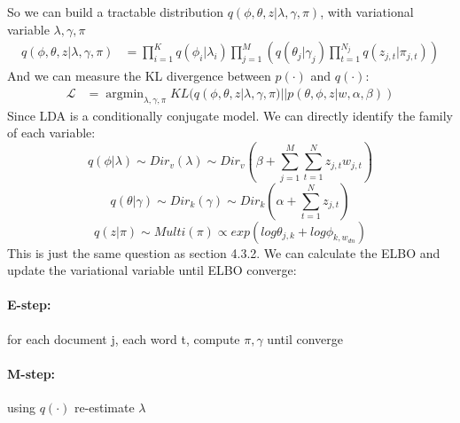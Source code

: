 \documentclass{article}
\begin{document}
So we can build a tractable distribution $q(\phi,\theta,z|\lambda ,\gamma, \pi)$, with variational variable $\lambda ,\gamma, \pi$
\begin{align*}
q(\phi,\theta,z|\lambda ,\gamma, \pi) &= \prod_{i=1}^{K}q(\phi_{i}|\lambda_{i}) \prod_{j=1}^{M}\left(q(\theta_{j}|\gamma_{j})\prod_{t=1}^{N_{j}}q(z_{j,t}|\pi_{j,t})\right)
\end{align*}
And we can measure the KL divergence between $p(\cdot)$ and $q(\cdot)$:
\begin{align*}
\mathcal{L} &= \mathop{\arg\min}_{\lambda ,\gamma, \pi} KL(q(\phi,\theta,z|\lambda ,\gamma, \pi)||p(\theta,\phi,z|w,\alpha,\beta))
\end{align*}
Since LDA is a conditionally conjugate model. We can directly identify the family of each variable:
$$q(\phi|\lambda) \sim Dir_{v}(\lambda) \sim Dir_{v}\left(\beta+\sum_{j=1}^{M}\sum_{t=1}^{N}z_{j,t} w_{j,t} \right)$$
$$q(\theta|\gamma) \sim Dir_{k}(\gamma) \sim  Dir_{k}(\alpha+\sum_{t=1}^{N}z_{j,t}) $$
$$q(z|\pi) \sim Multi(\pi)  \propto exp(log \theta_{j,k}+log \phi_{k,w_{dn}})$$
This is just the same question as section 4.3.2. We can calculate the ELBO and update the variational variable until ELBO converge:
\paragraph{E-step:} for each document j, each word t, compute $\pi, \gamma$ until converge
\paragraph{M-step:} using $q(\cdot)$ re-estimate $\lambda$
\end{document}
